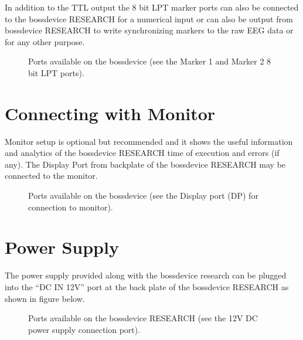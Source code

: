 \documentclass[letterpaper,10pt,english]{sphinxmanual}
\begin{document}
\sphinxAtStartPar
In addition to the TTL output the 8 bit LPT marker ports can also be connected to the bossdevice RESEARCH for a numerical input or can also be output from bossdevice RESEARCH to write synchronizing markers to the raw EEG data or for any other purpose.

\begin{figure}[htbp]
\centering
\capstart

\noindent{}
\caption{Ports available on the bossdevice (see the Marker 1 and Marker 2 8 bit LPT ports).}\label{\detokenize{2_setup_bossdevice_research:id6}}\end{figure}


\section{Connecting with Monitor}
\label{\detokenize{2_setup_bossdevice_research:connecting-with-monitor}}
\sphinxAtStartPar
Monitor setup is optional but recommended and it shows the useful information and analytics of the bossdevice RESEARCH time of execution and errors (if any). The Display Port from backplate of the bossdevice RESEARCH may be connected to the monitor.

\begin{figure}[htbp]
\centering
\capstart

\noindent{}
\caption{Ports available on the bossdevice (see the Display port (DP) for connection to monitor).}\label{\detokenize{2_setup_bossdevice_research:id7}}\end{figure}


\section{Power Supply}
\label{\detokenize{2_setup_bossdevice_research:power-supply}}
\sphinxAtStartPar
The power supply provided along with the bossdevice research can be plugged into the “DC IN 12V” port at the back plate of the bossdevice RESEARCH as shown in figure below.

\begin{figure}[htbp]
\centering
\capstart

\noindent{}
\caption{Ports available on the bossdevice RESEARCH (see the 12V DC power supply connection port).}\label{\detokenize{2_setup_bossdevice_research:id8}}\end{figure}
\end{document}
